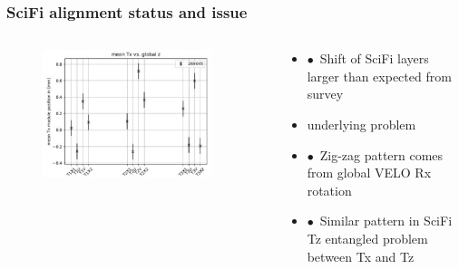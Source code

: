 \documentclass[aspectratio=1610, 12pt, xcolor=dvipsnames]{beamer}
\begin{document}
\begin{frame}\frametitle{SciFi alignment status and issue}
  \begin{columns}
    \begin{column}[c]{0.6\textwidth}
      \begin{figure}
        \centering
        \includegraphics[width=0.9\textwidth]{plots/outfiles_vs_global/Layers_Tx_pattern.png}
      \end{figure}
    \end{column}
    \begin{column}[c]{0.4\textwidth}
      \begin{itemize}
        \item $\bullet$\, Shift of SciFi layers larger than expected from survey
        \item \to underlying problem
        \item $\bullet$\, Zig-zag pattern comes from global VELO Rx rotation
        \item $\bullet$\, Similar pattern in SciFi Tz \to entangled problem between Tx and Tz
      \end{itemize}
    \end{column}
  \end{columns}
\end{frame}
\end{document}

